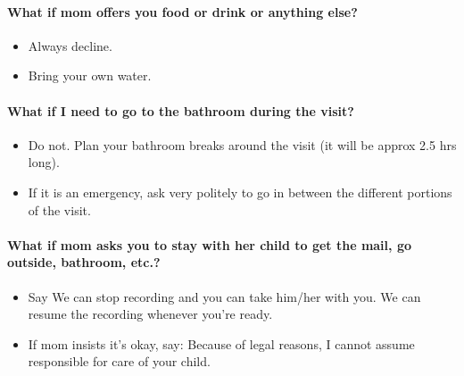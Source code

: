 \documentclass[
  12pt,
]{book}
\providecommand{\tightlist}{%
  \setlength{\itemsep}{0pt}\setlength{\parskip}{0pt}}
\begin{document}
\hypertarget{what-if-mom-offers-you-food-or-drink-or-anything-else}{%
\paragraph*{What if mom offers you food or drink or anything else?}\label{what-if-mom-offers-you-food-or-drink-or-anything-else}}

\begin{itemize}
\tightlist
\item
  Always decline.
\item
  Bring your own water.
\end{itemize}

\hypertarget{what-if-i-need-to-go-to-the-bathroom-during-the-visit}{%
\paragraph*{What if I need to go to the bathroom during the visit?}\label{what-if-i-need-to-go-to-the-bathroom-during-the-visit}}

\begin{itemize}
\tightlist
\item
  Do not. Plan your bathroom breaks around the visit (it will be approx 2.5 hrs long).
\item
  If it is an emergency, ask very politely to go in between the different portions of the visit.
\end{itemize}

\hypertarget{what-if-mom-asks-you-to-stay-with-her-child-to-get-the-mail-go-outside-bathroom-etc.}{%
\paragraph*{What if mom asks you to stay with her child to get the mail, go outside, bathroom, etc.?}\label{what-if-mom-asks-you-to-stay-with-her-child-to-get-the-mail-go-outside-bathroom-etc.}}

\begin{itemize}
\tightlist
\item
  Say We can stop recording and you can take him/her with you. We can resume the recording whenever you're ready.
\item
  If mom insists it's okay, say: Because of legal reasons, I cannot assume responsible for care of your child.
\end{itemize}
\end{document}

